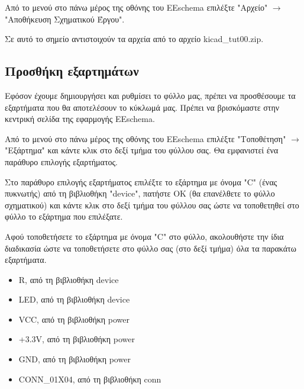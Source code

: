 \documentclass[a4paper]{article}
\begin{document}
Από το μενού στο πάνω μέρος της οθόνης του \textenglish{EEschema} επιλέξτε "Αρχείο" $\rightarrow$ "Αποθήκευση Σχηματικού Έργου".

\begin{figure}
  \begin{center}
    \label{fig:kicad-main}
  \end{center}
\end{figure}

Σε αυτό το σημείο αντιστοιχούν τα αρχεία από το αρχείο kicad\_tut00.zip.

\subsection{Προσθήκη εξαρτημάτων}
Εφόσον έχουμε δημιουργήσει και ρυθμίσει το φύλλο μας, πρέπει να προσθέσουμε τα εξαρτήματα που θα αποτελέσουν το κύκλωμά μας. Πρέπει να βρισκόμαστε στην κεντρική σελίδα της εφαρμογής \textenglish{EEschema}.

Από το μενού στο πάνω μέρος της οθόνης του \textenglish{EEschema} επιλέξτε "Τοποθέτηση" $\rightarrow$ "Εξάρτημα" και κάντε κλικ στο δεξί τμήμα του φύλλου σας. Θα εμφανιστεί ένα παράθυρο επιλογής εξαρτήματος.

\begin{figure}
  \begin{center}
    \label{fig:kicad-main}
  \end{center}
\end{figure}

Στο παράθυρο επιλογής εξαρτήματος επιλέξτε το εξάρτημα με όνομα "C" (ένας πυκνωτής) από τη βιβλιοθήκη "device", πατήστε ΟΚ (θα επανέλθετε το φύλλο σχηματικού) και κάντε κλικ στο δεξί τμήμα του φύλλου σας ώστε να τοποθετηθεί στο φύλλο το εξάρτημα που επιλέξατε. 

Αφού τοποθετήσετε το εξάρτημα με όνομα "C" στο φύλλο, ακολουθήστε την ίδια διαδικασία ώστε να τοποθετήσετε στο φύλλο σας (στο δεξί τμήμα) όλα τα παρακάτω εξαρτήματα. 

\begin{itemize}
    \item R, από τη βιβλιοθήκη device
    \item \textenglish{LED}, από τη βιβλιοθήκη device
    \item VCC, από τη βιβλιοθήκη power
    \item +3.3V, από τη βιβλιοθήκη power
    \item GND, από τη βιβλιοθήκη power
    \item CONN\_01X04, από τη βιβλιοθήκη conn
\end{itemize}
\end{document}
